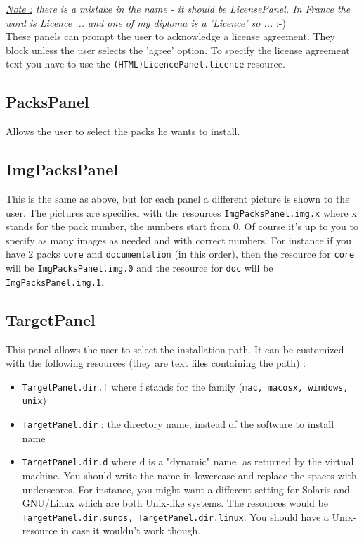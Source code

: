 \noindent
\textit{\underline{Note :} there is a mistake in the name - it should be
LicensePanel. In France the word is Licence ... and one of my diploma is a
'Licence' so ...} :-)\\

These panels can prompt the user to acknowledge a license agreement. They block
unless the user selects the 'agree' option. To specify the license agreement
text you have to use the \texttt{(HTML)LicencePanel.licence} resource.\\

\subsection{PacksPanel}

Allows the user to select the packs he wants to install.\\

\subsection{ImgPacksPanel}

This is the same as above, but for each panel a different picture is
shown to the user. The pictures are specified with the resources
\texttt{ImgPacksPanel.img.x} where x stands for the pack number, the
numbers start from 0. Of course it's up to you to specify as many images
as needed and with correct numbers. For instance if you have 2 packs
\texttt{core} and \texttt{documentation} (in this order), then the resource for
\texttt{core} will be \texttt{ImgPacksPanel.img.0} and the resource for
\texttt{doc} will be \texttt{ImgPacksPanel.img.1}.\\

\subsection{TargetPanel}

This panel allows the user to select the installation path. It can be customized with
the following resources (they are text files containing the path) :
\begin{itemize}

  \item \texttt{TargetPanel.dir.f} where f stands for the family (\texttt{mac,
  macosx, windows, unix})
  \item \texttt{TargetPanel.dir} : the directory name, instead of the software
  to install name
  \item \texttt{TargetPanel.dir.d} where d is a "dynamic" name, as returned by
  the \Java virtual machine. You should write the name in lowercase and replace the
  spaces with underscores. For instance, you might want a different setting for
  Solaris and GNU/Linux which are both Unix-like systems. The resources would be
  \texttt{TargetPanel.dir.sunos, TargetPanel.dir.linux}. You should have a
  Unix-resource in case it wouldn't work though.

\end{itemize}\

